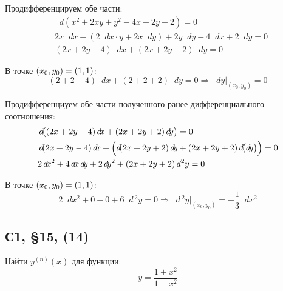 \documentclass[a4paper,12pt]{article}
\newcommand{\diff}{\mathop{}\!d\!}
\begin{document}
  \begin{solution}
    Продифференцируем обе части:
    \[
      \begin{aligned}
        &\diff \left(x^2 + 2xy + y^2 - 4x + 2y - 2\right) = 0\\
        &2x \diff x + (2 \diff x \cdot y + 2x \diff y) + 2y \diff y - 4 \diff x + 2 \diff y = 0\\
        &(2x + 2y - 4) \diff x + (2x + 2y + 2) \diff y = 0
      \end{aligned}
    \]

    В точке $(x_0, y_0) \hm= (1, 1)$:
    \[
      (2 + 2 - 4) \diff x + (2 + 2 + 2) \diff y = 0 \Rightarrow \diff y|_{(x_0, y_0)} = 0
    \]

    Продифференциуем обе части полученного ранее дифференциального соотношения:
    \[
      \begin{aligned}
        &\diff \bigl((2x + 2y - 4) \diff x + (2x + 2y + 2) \diff y\bigr) = 0\\
        &\diff (2x + 2y - 4) \diff x + \Bigl(\diff (2x + 2y + 2) \diff y + (2x + 2y + 2) \diff \bigl(\diff y\bigr)\Bigr) = 0\\
        &2 \diff x^2 + 4 \diff x \diff y + 2 \diff y^2 + (2x + 2y + 2) \diff\,^2 y = 0
      \end{aligned}
    \]

    В точке $(x_0, y_0) \hm= (1, 1)$:
    \[
      2 \diff x^2 + 0 + 0 + 6 \diff\,^2 y = 0 \Rightarrow \diff\,^2 y|_{(x_0, y_0)} = -\frac{1}{3} \diff x^2
    \]
  \end{solution}

  

  \subsection{С1, \S 15, (14)}\label{sec:1-15-24(14)}

  Найти $y^{(n)}(x)$ для функции:
  \[
    y = \frac{1 + x^2}{1 - x^2}
  \]
  
\end{document}
